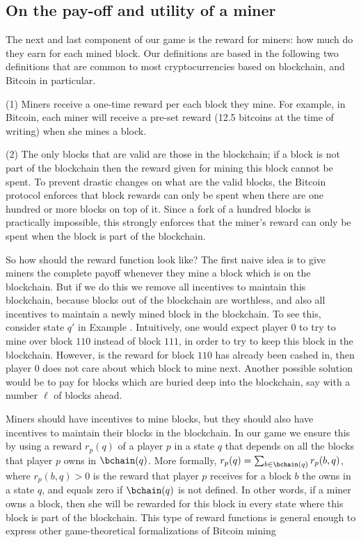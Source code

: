 
\subsection{On the pay-off and utility of a miner}\label{sec-wtf}

The next and last component of our game is the reward for miners: how much do they earn for each mined block. Our definitions are based in the following 
two definitions that are common to most cryptocurrencies based on blockchain, and Bitcoin in particular. 

\noindent
(1) Miners receive a one-time reward per each block they mine. For example, in Bitcoin, each miner will receive a pre-set reward (12.5 bitcoins at the time of writing) when she mines a block.

\noindent
(2) The only blocks that are valid are those in the blockchain; if a block is not part of the blockchain then the reward given for mining this block cannot be spent. To prevent drastic changes on what are the valid blocks, the Bitcoin protocol enforces that block rewards can only be spent when there are one hundred or more blocks on top of it. Since a fork of a hundred blocks is practically impossible, this strongly enforces that the miner's reward can only be spent when the block is part of the blockchain.  

So how should the reward function look like? The first naive idea is to give miners the complete payoff whenever they mine a block which is on the blockchain. But if we do this we remove all incentives to maintain this blockchain, because blocks out of the blockchain are worthless, and also all incentives to maintain a newly mined block in the blockchain. To see this, consider state $q'$ in Example \label{ex-mining}. Intuitively, one would expect player $0$ to try to mine over block $110$ instead of block $111$, in order to try to keep this block in the blockchain. However, is the reward for block $110$ has already been cashed in, then player $0$ does not care about which block to mine next. Another possible solution would be to pay for blocks which are buried deep into the blockchain, say with a number $\ell$ of blocks ahead. 

Miners should have incentives to mine blocks, but they should also have incentives to maintain their blocks in the blockchain. In our game we 
ensure this by using a reward $r_p(q)$ of a player $p$ in a state $q$ that depends on all the blocks that player $p$ owns in $\bchain(q)$. More formally, $r_p(q)= \sum_{b \in \bchain(q)} r_p(b,q)$, where $r_p(b,q) > 0$ is the reward that player $p$ receives for a block $b$ the owns in a state $q$, and equals zero if $\bchain(q)$ is not defined. 
In other words, if a miner owns a block, then she will be rewarded for this block in every state where this block is part of the blockchain. 
This type of reward functions is general enough to express other game-theoretical formalizations of Bitcoin mining \cite{mininggames:2016}


